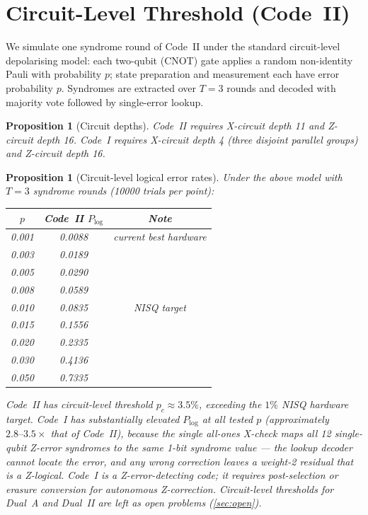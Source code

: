\documentclass[12pt,a4paper]{article}
\theoremstyle{plain}
\newtheorem{proposition}[theorem]{Proposition}
\theoremstyle{definition}
\theoremstyle{remark}
\begin{document}
\section{Circuit-Level Threshold (Code~II)}\label{sec:circuit}

We simulate one syndrome round of Code~II under the standard
circuit-level depolarising model: each two-qubit (CNOT) gate applies
a random non-identity Pauli with probability $p$; state preparation
and measurement each have error probability $p$.
Syndromes are extracted over $T=3$ rounds and decoded with majority
vote followed by single-error lookup.

\begin{proposition}[Circuit depths]\label{prop:depths}
Code~II requires X-circuit depth 11 and Z-circuit depth 16.
Code~I requires X-circuit depth 4 (three disjoint parallel groups)
and Z-circuit depth 16.
\end{proposition}

\begin{proposition}[Circuit-level logical error rates]\label{prop:circuit}
Under the above model with $T=3$ syndrome rounds (10000 trials per point):
\begin{center}
\small
\begin{tabular}{ccc}
\toprule
$p$ & Code~II $P_{\log}$ & Note \\
\midrule
0.001 & 0.0088 & current best hardware \\
0.003 & 0.0189 & \\
0.005 & 0.0290 & \\
0.008 & 0.0589 & \\
0.010 & 0.0835 & NISQ target \\
0.015 & 0.1556 & \\
0.020 & 0.2335 & \\
0.030 & 0.4136 & \\
0.050 & 0.7335 & \\
\bottomrule
\end{tabular}
\end{center}
Code~II has circuit-level threshold $p_c \approx 3.5\%$, exceeding the
$1\%$ NISQ hardware target.
Code~I has substantially elevated $P_{\log}$ at all tested $p$
(approximately $2.8\text{--}3.5\times$ that of Code~II), because the single
all-ones X-check maps all 12 single-qubit Z-error syndromes to the same
1-bit syndrome value — the lookup decoder cannot locate the error, and any
wrong correction leaves a weight-2 residual that is a Z-logical.
Code~I is a Z-error-\emph{detecting} code; it requires post-selection or
erasure conversion for autonomous Z-correction.
Circuit-level thresholds for Dual~A and Dual~II are left as open
problems (\cref{sec:open}).
\end{proposition}
\end{document}
